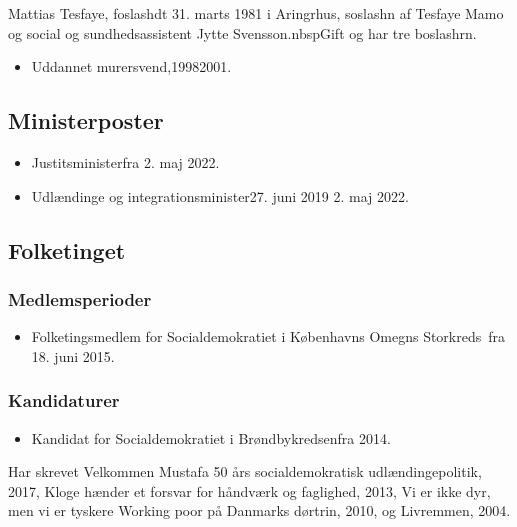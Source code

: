 \documentclass[11pt, a4paper]{awesome-cv}
\begin{document}
\makecvheader[R]
\makelettertitle
\begin{cvletter}
Mattias Tesfaye, foslashdt 31. marts 1981 i Aringrhus, soslashn af Tesfaye Mamo og social og sundhedsassistent Jytte Svensson.nbspGift og har tre boslashrn.

\begin{itemize}
\item Uddannet murersvend,19982001.
\end{itemize}
\subsection*{Ministerposter}
\begin{itemize}
\item Justitsministerfra 2. maj 2022.
\item Udlændinge og integrationsminister27. juni 2019  2. maj 2022.
\end{itemize}
\subsection*{Folketinget}
\subsubsection*{Medlemsperioder}
\begin{itemize}
\item Folketingsmedlem for Socialdemokratiet i Københavns Omegns Storkreds fra 18. juni 2015.
\end{itemize}
\subsubsection*{Kandidaturer}
\begin{itemize}
\item Kandidat for Socialdemokratiet i Brøndbykredsenfra 2014.
\end{itemize}
Har skrevet Velkommen Mustafa  50 års socialdemokratisk udlændingepolitik, 2017, Kloge hænder  et forsvar for håndværk og faglighed, 2013, Vi er ikke dyr, men vi er tyskere  Working poor på Danmarks dørtrin, 2010, og Livremmen, 2004.

\end{cvletter}
\end{document}
